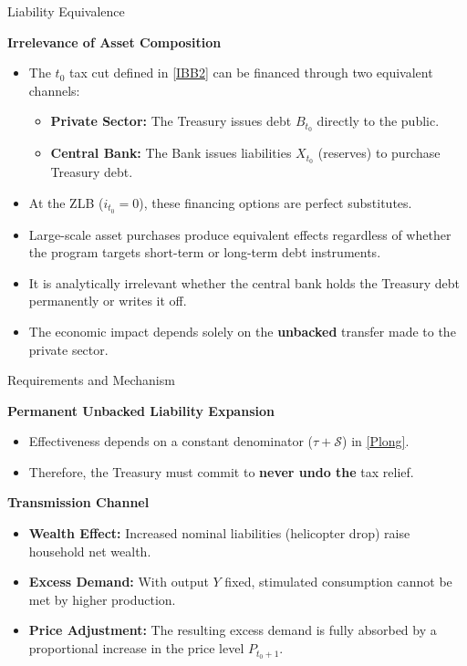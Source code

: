 \documentclass[11pt,aspectratio=169]{beamer}
\begin{document}
\begin{frame}{Liability Equivalence}
\small

\textbf{Irrelevance of Asset Composition}
\begin{itemize}
    \item The $t_0$ tax cut defined in \eqref{IBB2} can be financed through two equivalent channels:
    \begin{itemize}
        \item \textbf{Private Sector:} The Treasury issues debt $B_{t_0}$ directly to the public.
        \item \textbf{Central Bank:} The Bank issues liabilities $X_{t_0}$ (reserves) to purchase Treasury debt.
    \end{itemize}
    \item At the ZLB ($i_{t_0}=0$), these financing options are perfect substitutes.
    \item Large-scale asset purchases produce equivalent effects regardless of whether the program targets short-term or long-term debt instruments.
    \item It is analytically irrelevant whether the central bank  holds the Treasury debt permanently or writes it off.
    \item The economic impact depends solely on the \textbf{unbacked} transfer made to the private sector.
\end{itemize}
\end{frame}
\begin{frame}{Requirements and Mechanism}
\small

\textbf{Permanent Unbacked Liability Expansion}
\begin{itemize}
    \item Effectiveness depends on a constant denominator ($\tau + \mathcal{S}$) in \eqref{Plong}.
    \item Therefore, the Treasury must commit to \textbf{never undo the} tax relief.
\end{itemize}

\vspace{0.4cm}

\textbf{Transmission Channel}
\begin{itemize}
    \item \textbf{Wealth Effect:} Increased nominal liabilities (helicopter drop) raise household net wealth.
    \item \textbf{Excess Demand:} With output $Y$ fixed, stimulated consumption cannot be met by higher production.
    \item \textbf{Price Adjustment:} The resulting excess demand is fully absorbed by a proportional increase in the price level $P_{t_0+1}$.
\end{itemize}
\end{frame}
\end{document}

